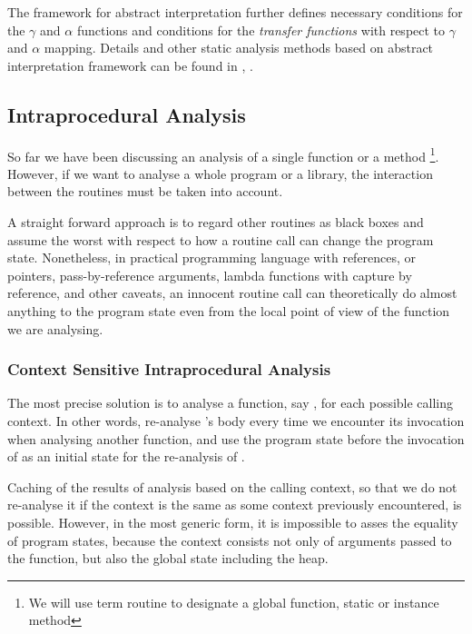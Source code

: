         The framework for abstract interpretation further defines 
        necessary conditions for the $\gamma$ and $\alpha$ functions 
        and conditions for the \emph{transfer functions} with respect 
        to $\gamma$ and $\alpha$ mapping. Details and other 
        static analysis methods based on abstract interpretation 
        framework can be found in \cite{cousot1977abstract}, 
        \cite{Cousot2000abstract}.

        \subsection{Intraprocedural Analysis}
        
        So far we have been discussing an analysis of a single function 
        or a method \footnote{We will use term 
        routine to designate a global function, static or instance method}. 
        However, if we want to analyse a whole program or 
        a library, the interaction between the routines 
        must be taken into account.
        
        A straight forward approach is to regard other routines as 
        black boxes and assume the worst with respect to how a 
        routine call can change the program state. Nonetheless, 
        in practical programming language with references, or pointers,  
        pass-by-reference arguments, lambda functions with 
        capture by reference, and other caveats, an innocent 
        routine call can theoretically do almost anything to 
        the program state even from the local point of view 
        of the function we are analysing.
                
        \subsubsection*{Context Sensitive Intraprocedural Analysis}
        
        The most precise solution is to analyse a function, 
        say , for each possible calling context. 
        In other words, re-analyse 's body every 
        time we encounter its invocation when analysing another 
        function, and use the program state before 
        the invocation of  as an initial state 
        for the re-analysis of .
        
        Caching of the results of analysis based on 
        the calling context, so that we do not re-analyse it 
        if the context is the same as some context previously 
        encountered, is possible. However, in the most generic 
        form, it is impossible to asses the equality of 
        program states, because the context consists not only 
        of arguments passed to the function, but also the 
        global state including the heap.
        
